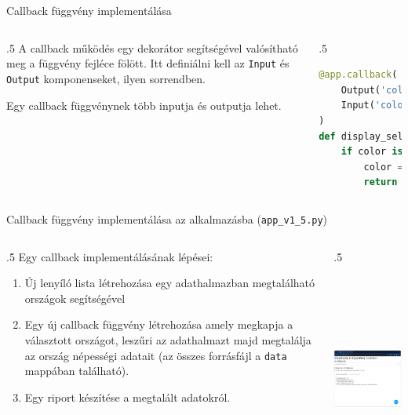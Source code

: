 \documentclass[english, aspectratio=169]{beamer}
\begin{document}
	\begin{frame}[fragile]{Callback függvény implementálása}
		\begin{columns}
			\begin{column}{.5\textwidth}
				A callback működés egy dekorátor segítségével valósítható meg a függvény fejléce fölött. Itt definiálni kell az \texttt{Input} és \texttt{Output} komponenseket, ilyen sorrendben.\par\smallskip
				Egy callback függvénynek több inputja és outputja lehet.
			\end{column}
			\begin{column}{.5\textwidth}
				\begin{lstlisting}[language=python]
@app.callback(
	Output('color_output', 'children'),
	Input('color_dropdown', 'value')
)
def display_selected_color(color):
	if color is None:	
		color = 'nothing'
		return 'You selected ' + color
				\end{lstlisting}
			\end{column}
		\end{columns}
	\end{frame}
	
	\begin{frame}[fragile]{Callback függvény implementálása az alkalmazásba (\texttt{app\_v1\_5.py})}
		\begin{columns}
			\begin{column}{.5\textwidth}
				Egy callback implementálásának lépései:
				\begin{enumerate}
					\item Új lenyíló lista létrehozása egy adathalmazban megtalálható országok segítségével
					\item Egy új callback függvény létrehozása amely megkapja a választott országot, leszűri az adathalmazt majd megtalálja az ország népességi adatait (az összes forrásfájl a \texttt{data} mappában található). 
					\item Egy riport készítése a megtalált adatokról. 
				\end{enumerate}
			\end{column}
			\begin{column}{.5\textwidth}
				\begin{center}
					\includegraphics[width=7cm, height=7cm, keepaspectratio]{images/dash_14.png}
				\end{center}
			\end{column}
		\end{columns}
	\end{frame}
	
\end{document}
